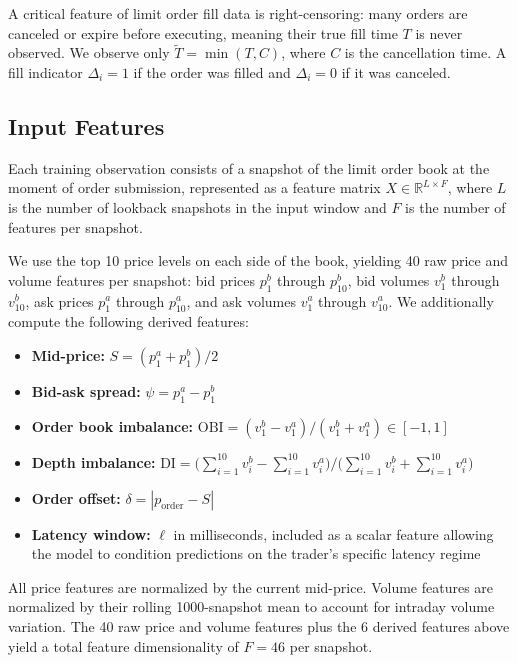 \documentclass[12pt]{article}
\begin{document}
A critical feature of limit order fill data is right-censoring: many orders are canceled or expire before executing, meaning their true fill time $T$ is never observed. We observe only $\tilde{T} = \min(T, C)$, where $C$ is the cancellation time. A fill indicator $\Delta_i = 1$ if the order was filled and $\Delta_i = 0$ if it was canceled.

\subsection{Input Features}

Each training observation consists of a snapshot of the limit order book at the moment of order submission, represented as a feature matrix $X \in \mathbb{R}^{L \times F}$, where $L$ is the number of lookback snapshots in the input window and $F$ is the number of features per snapshot.

We use the top 10 price levels on each side of the book, yielding 40 raw price and volume features per snapshot: bid prices $p^b_1$ through $p^b_{10}$, bid volumes $v^b_1$ through $v^b_{10}$, ask prices $p^a_1$ through $p^a_{10}$, and ask volumes $v^a_1$ through $v^a_{10}$. We additionally compute the following derived features:
\begin{itemize}[leftmargin=2em]
  \item \textbf{Mid-price:} $S = (p^a_1 + p^b_1) / 2$
  \item \textbf{Bid-ask spread:} $\psi = p^a_1 - p^b_1$
  \item \textbf{Order book imbalance:} $\mathrm{OBI} = (v^b_1 - v^a_1)/(v^b_1 + v^a_1) \in [-1, 1]$
  \item \textbf{Depth imbalance:} $\mathrm{DI} = \bigl(\sum_{i=1}^{10} v^b_i - \sum_{i=1}^{10} v^a_i\bigr) \big/ \bigl(\sum_{i=1}^{10} v^b_i + \sum_{i=1}^{10} v^a_i\bigr)$
  \item \textbf{Order offset:} $\delta = |p_{\mathrm{order}} - S|$
  \item \textbf{Latency window:} $\ell$ in milliseconds, included as a scalar feature allowing the model to condition predictions on the trader's specific latency regime
\end{itemize}

All price features are normalized by the current mid-price. Volume features are normalized by their rolling 1000-snapshot mean to account for intraday volume variation. The 40 raw price and volume features plus the 6 derived features above yield a total feature dimensionality of $F = 46$ per snapshot.
\end{document}
